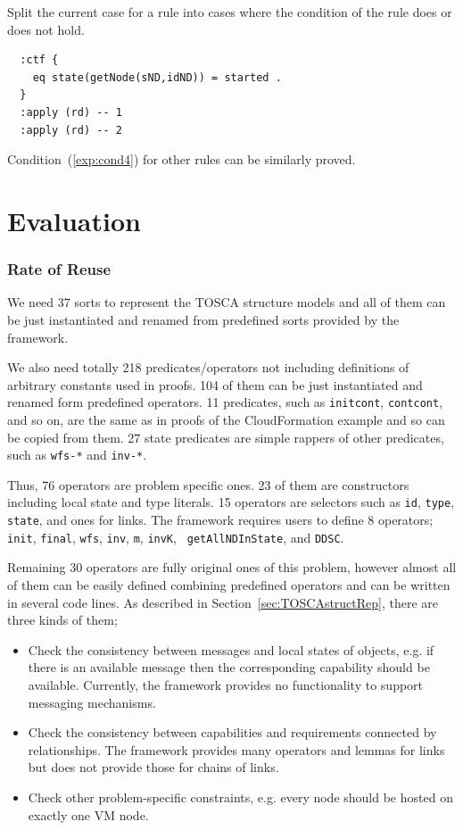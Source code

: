 \documentclass[12pt]{report}
\begin{document}
 Split the current case for a rule into
cases where the condition of the rule does or does not hold. 
\small
\begin{verbatim}
  :ctf {
    eq state(getNode(sND,idND)) = started .
  }
  :apply (rd) -- 1
  :apply (rd) -- 2
\end{verbatim}
\normalsize
Condition~(\ref{exp:cond4}) for other rules can be similarly proved.

\section{Evaluation}
\label{sec:evaluation}
\subsubsection{Rate of Reuse}
We need 37 sorts to represent the TOSCA structure models and all of
them can be just instantiated and renamed from predefined sorts
provided by the framework.

We also need totally 218 predicates/operators not including
definitions of arbitrary constants used in proofs. 104 of them can be
just instantiated and renamed form predefined operators. 11
predicates, such as {\tt initcont}, {\tt contcont}, and so on, are the
same as in proofs of the CloudFormation example and so can be copied
from them.  27 state predicates are simple rappers of other
predicates, such as {\tt wfs-*} and {\tt inv-*}.

Thus, 76 operators are problem specific ones. 23 of them are
constructors including local state and type literals. 15 operators are
selectors such as {\tt id}, {\tt type}, {\tt state}, and ones for
links. The framework requires users to define 8 operators; {\tt init},
{\tt final}, {\tt wfs}, {\tt inv}, {\tt m}, {\tt invK}, {\tt
  getAllNDInState}, and {\tt DDSC}.

Remaining 30 operators are fully original ones of this problem,
however almost all of them can be easily defined combining predefined
operators and can be written in several code lines. As described in
Section~\ref{sec:TOSCAstructRep}, there are three kinds of them;
\begin{itemize}
\item Check the consistency between messages and local states of
  objects, e.g. if there is an available message then the
  corresponding capability should be available. Currently, the
  framework provides no functionality to support messaging mechanisms.
\item Check the consistency between capabilities and requirements
  connected by relationships. The framework provides many operators
  and lemmas for links but does not provide those for chains of links.
\item Check other problem-specific constraints, e.g.  every node
  should be hosted on exactly one VM node.
\end{itemize}
\end{document}
